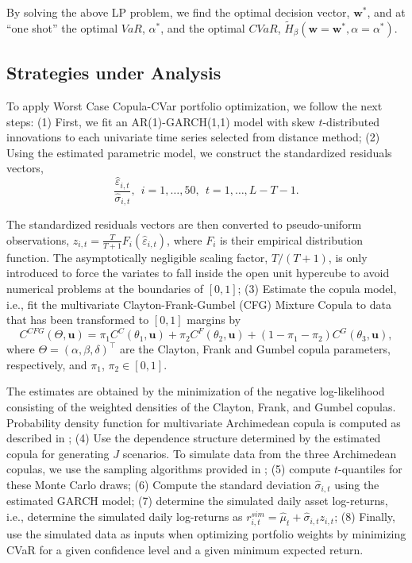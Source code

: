 \documentclass[a4paper,10pt]{article}
\begin{document}
By solving the above LP problem, we find the optimal decision vector, $\mathbf{w}^{\ast }$, and at ``one shot'' the optimal $VaR$, $\alpha ^{\ast }$, and the optimal $CVaR$, $\widetilde{H}_{\beta}\left(\mathbf{w}=\mathbf{w}^{\ast },\alpha =\alpha ^{\ast }\right) $.

\subsection{Strategies under Analysis}

 To apply Worst Case Copula-CVar portfolio optimization, we follow the next steps: (1) First, we fit an AR(1)-GARCH(1,1) model with skew $t$-distributed innovations to each univariate time series selected from distance method; (2) Using the estimated parametric model, we construct the standardized residuals vectors,
\begin{equation*}
\frac{\widehat{\varepsilon }_{i,t}}{\widehat{\sigma }_{i,t}}, ~~i=1,\ldots,50, ~~ t=1,\ldots,L-T-1.
\end{equation*}

The standardized residuals vectors are then converted to pseudo-uniform observations, $z_{i,t}=\frac{T}{T+1}F_{i}\left( \widehat{\varepsilon }_{i,t}\right) $, where $F_{i}$ is their empirical distribution function. The asymptotically negligible scaling factor, $T/(T+1)$, is only introduced to force the variates to fall inside the open unit hypercube to avoid numerical problems at the boundaries of $[0,1]$; (3) Estimate the copula model, i.e., fit the multivariate Clayton-Frank-Gumbel (CFG) Mixture Copula to data that has been transformed to $[0,1]$ margins by
\begin{equation}
C^{CFG}( \Theta ,\mathbf{u}) =\pi _{1}C^{C}( \theta _{1},\mathbf{u}) +\pi
_{2}C^{F}( \theta _{2},\mathbf{u}) +(1-\pi _{1}-\pi _{2}) C^{G}( \theta _{3},\mathbf{u}),
\end{equation}
where $\Theta=\left(\alpha,\beta,\delta\right)^{\top }$ are the Clayton, Frank and Gumbel copula parameters, respectively, and $\pi_{1}$, $\pi_{2} \in [0,1]$. 

The estimates are obtained by the minimization of the negative log-likelihood consisting of the weighted densities of the Clayton, Frank, and Gumbel copulas. Probability density function for multivariate Archimedean copula is computed as described in \citet*{mcneil2009}; (4) Use the dependence structure determined by the estimated copula for generating $J $ scenarios. To simulate data from the three Archimedean copulas, we use the sampling algorithms provided in \citet*{melchiori2006}; (5) compute
$t$-quantiles for these Monte Carlo draws; (6) Compute the standard deviation $\widehat{\sigma }_{i,t}$ using the estimated GARCH model; (7) determine the simulated daily asset log-returns, i.e., determine the simulated daily log-returns as $r_{i,t}^{sim}=\widehat{\mu }_{t}+\widehat{\sigma }_{i,t}z_{i,t}$; (8) Finally, use the simulated data as inputs when optimizing portfolio weights by minimizing CVaR for a given confidence level and a given minimum expected return.
\end{document}
